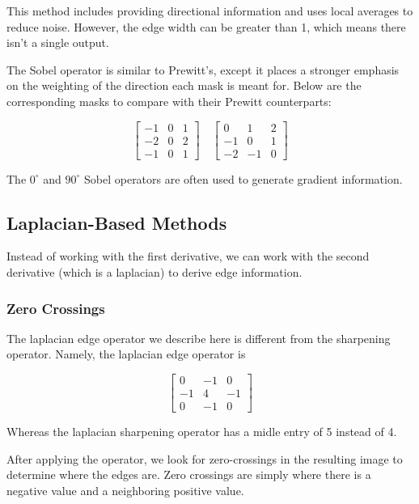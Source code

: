 \documentclass{article}
\begin{document}
\begin{multicols}{2}
This method includes providing directional information and uses local averages to reduce noise. However, the edge width can be greater than 1, which means there isn't a single output.

The Sobel operator is similar to Prewitt's, except it places a stronger emphasis on the weighting of the direction each mask is meant for. Below are the corresponding masks to compare with their Prewitt counterparts:

$$
\begin{bmatrix}
  -1 & 0 & 1\\
  -2 & 0 & 2\\
  -1 & 0 & 1
\end{bmatrix}\quad
\begin{bmatrix}
  0 & 1 & 2\\
  -1 & 0 & 1\\
  -2 & -1 & 0
\end{bmatrix}
$$

The $0^{\circ}$ and $90^{\circ}$ Sobel operators are often used to generate gradient information.

\subsection{Laplacian-Based Methods}

Instead of working with the first derivative, we can work with the second derivative (which is a laplacian) to derive edge information.

\subsubsection{Zero Crossings}

The laplacian edge operator we describe here is different from the sharpening operator. Namely, the laplacian edge operator is 

$$
\begin{bmatrix}
  0 & -1 & 0\\
  -1 & 4 & -1\\
  0 & -1 & 0
\end{bmatrix}
$$

Whereas the laplacian sharpening operator has a midle entry of 5 instead of 4.

After applying the operator, we look for zero-crossings in the resulting image to determine where the edges are. Zero crossings are simply where there is a negative value and a neighboring positive value.


\end{multicols}
\end{document}
